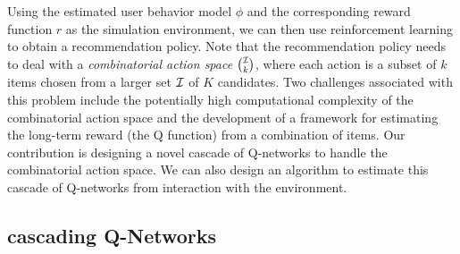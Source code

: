 \documentclass{article} %
\begin{document}
Using the estimated user behavior model $\phi$ and the corresponding reward function $r$ as the simulation environment, we can then use reinforcement learning to obtain a recommendation policy. Note that the recommendation policy needs to deal with a {\it combinatorial action space} ${\mathcal{I}} \choose k$, where each action is a subset of $k$ items chosen from a larger set ${\mathcal{I}}$ of $K$ candidates.
Two challenges associated with this problem include the potentially high computational complexity of the combinatorial action space and the development of a framework for estimating the long-term reward (the Q function) from a combination of items. Our contribution is designing a novel cascade of Q-networks to handle the combinatorial action space. We can also design an algorithm to estimate this cascade of Q-networks from interaction with the environment. 
\vspace{-3mm}
\subsection{cascading Q-Networks}
\vspace{-2mm}
\end{document}
